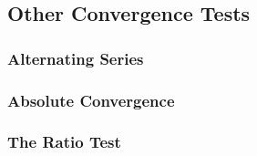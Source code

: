 \subsection{Other Convergence Tests}

\subsubsection*{Alternating Series}

\subsubsection*{Absolute Convergence}

\subsubsection*{The Ratio Test}